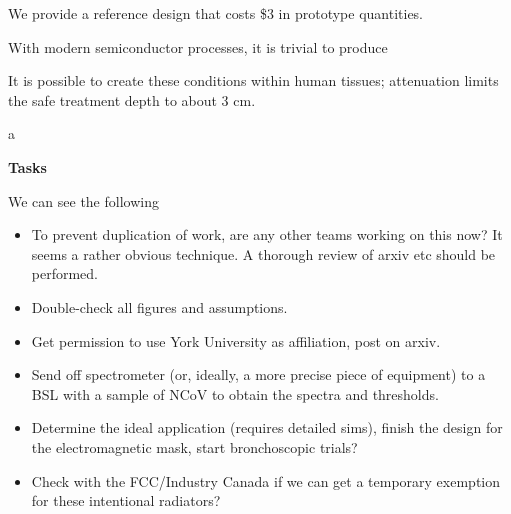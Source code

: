 \documentclass[fleqn,10pt]{paper}
\begin{document}
We provide a reference design that costs \$3 in prototype quantities.

With modern semiconductor processes, it is trivial to produce 

It is possible to create these conditions within human tissues; attenuation limits the safe treatment depth to about 3 cm.

\begin{autem}
	a
\end{autem}


{\Large \textbf{Tasks}}

We can see the following 

\begin{itemize}
	\item To prevent duplication of work, are any other teams working on this now? It seems a rather obvious technique. A thorough review of arxiv etc should be performed.
	\item Double-check all figures and assumptions.
	\item Get permission to use York University as affiliation, post on arxiv.
	\item Send off spectrometer (or, ideally, a more precise piece of equipment) to a BSL with a sample of NCoV to obtain the spectra and thresholds.
	\item Determine the ideal application (requires detailed sims), finish the design for the electromagnetic mask, start bronchoscopic trials?
			
	\item Check with the FCC/Industry Canada if we can get a temporary exemption for these intentional radiators?
	
\end{itemize}


\clearpage




\printbibliography[heading=none, title={}]
\end{document}
